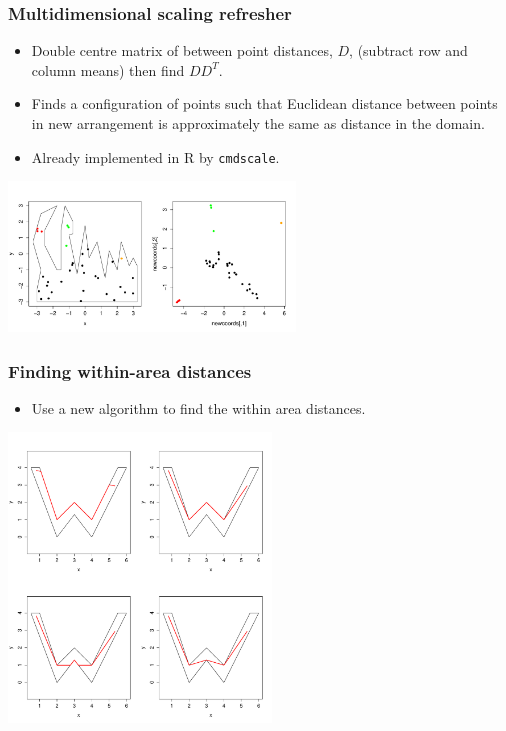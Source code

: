 \documentclass[ignorenonframetext]{beamer} %
\newcommand{\bi}{\begin{itemize}}
\newcommand{\ei}{\end{itemize}}
\begin{document}
\begin{frame}
	\frametitle{Multidimensional scaling refresher}
       \bi
         \item Double centre matrix of between point distances, $D$, (subtract row and column means) then find $DD^T$.
         \item Finds a configuration of points such that Euclidean distance between points in new arrangement is approximately the same as distance in the domain.
         \item Already implemented in \textsf{R} by \texttt{cmdscale}.
        \ei
            \centering
              \includegraphics[width=3in]{figs/wt2-pco-example.pdf}\\
        
\end{frame}

\begin{frame}
	\frametitle{Finding within-area distances}
       \bi
         \item Use a new algorithm to find the within area distances.
        \ei
            \centering
              \includegraphics[width=2.75in]{figs/doubleyah-example.pdf}\\
\end{frame}
\end{document}
